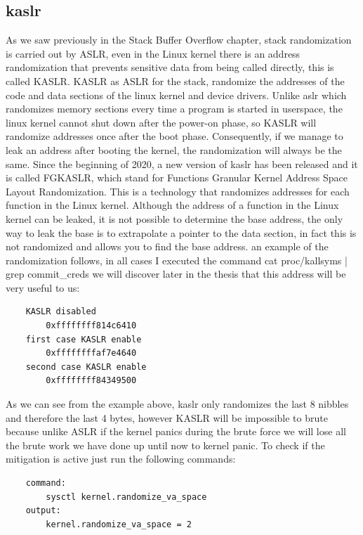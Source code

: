     \subsection{kaslr}

    As we saw previously in the Stack Buffer Overflow chapter, stack randomization is carried out by ASLR, even in the Linux kernel there is an address randomization that prevents sensitive data from being called directly, this is called KASLR. \newline
    KASLR as ASLR for the stack, randomize the addresses  of the code and data sections of the linux kernel and device drivers.\newline
    Unlike aslr which randomizes memory sections every time a program is started in userspace, the linux kernel cannot shut down after the power-on phase, so KASLR will randomize addresses once after the boot phase.\newline
    Consequently, if we manage to leak an address after booting the kernel, the randomization will always be the same.\newline
    Since the beginning of 2020, a new version of kaslr has been released and it is called FGKASLR, which stand for Functions Granular Kernel Address Space Layout Randomization.\newline 
    This is a technology that randomizes addresses for each function in the Linux kernel.\newline 
    Although the address of a function in the Linux kernel can be leaked, it is not possible to determine the base address, the only way to leak the base is to extrapolate a pointer to the data section, in fact this is not randomized and allows you to find the base address.\newline
    an example of the randomization follows, in all cases I executed the command cat proc/kallsyms | grep commit\_creds we will discover later in the thesis that this address will be very useful to us:\newline
    \begin{verbatim}
    KASLR disabled 
        0xffffffff814c6410
    first case KASLR enable  
        0xffffffffaf7e4640
    second case KASLR enable
        0xffffffff84349500
    \end{verbatim}
    As we can see from the example above, kaslr only randomizes the last 8 nibbles and therefore the last 4 bytes, however KASLR will be impossible to brute because unlike ASLR if the kernel panics during the brute force we will lose all the brute work we have done up until now to kernel panic.\newline
    To check if the mitigation is active just run the following commands: \newline
    \begin{verbatim}
    command:
        sysctl kernel.randomize_va_space                  
    output:
        kernel.randomize_va_space = 2

    \end{verbatim}
    \clearpage
